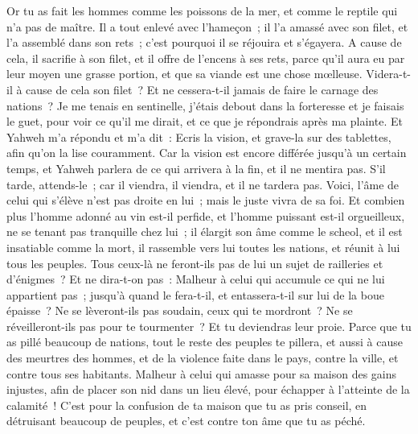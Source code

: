 \begin{multicols}{2}
Or tu as fait les hommes comme les poissons de la mer, et comme le reptile qui n'a pas de maître.
Il a tout enlevé avec l'hameçon~; il l'a amassé avec son filet, et l'a assemblé dans son rets~; c'est pourquoi il se réjouira et s'égayera.
A cause de cela, il sacrifie à son filet, et il offre de l'encens à ses rets, parce qu'il aura eu par leur moyen une grasse portion, et que sa viande est une chose mœlleuse.
Videra-t-il à cause de cela son filet~? Et ne cessera-t-il jamais de faire le carnage des nations~?
\VerseOne{}Je me tenais en sentinelle, j'étais debout dans la forteresse et je faisais le guet, pour voir ce qu'il me dirait, et ce que je répondrais après ma plainte.
Et Yahweh m'a répondu et m'a dit~: Ecris la vision, et grave-la sur des tablettes, afin qu'on la lise couramment.
Car la vision est encore différée jusqu'à un certain temps, et Yahweh parlera de ce qui arrivera à la fin, et il ne mentira pas. S'il tarde, attends-le~; car il viendra, il viendra, et il ne tardera pas.
Voici, l'âme de celui qui s'élève n'est pas droite en lui~; mais le juste vivra de sa foi.
Et combien plus l'homme adonné au vin est-il perfide, et l'homme puissant est-il orgueilleux, ne se tenant pas tranquille chez lui~; il élargit son âme comme le scheol, et il est insatiable comme la mort, il rassemble vers lui toutes les nations, et réunit à lui tous les peuples.
Tous ceux-là ne feront-ils pas de lui un sujet de railleries et d'énigmes~? Et ne dira-t-on pas~: Malheur à celui qui accumule ce qui ne lui appartient pas~; jusqu'à quand le fera-t-il, et entassera-t-il sur lui de la boue épaisse~?
Ne se lèveront-ils pas soudain, ceux qui te mordront~? Ne se réveilleront-ils pas pour te tourmenter~? Et tu deviendras leur proie.
Parce que tu as pillé beaucoup de nations, tout le reste des peuples te pillera, et aussi à cause des meurtres des hommes, et de la violence faite dans le pays, contre la ville, et contre tous ses habitants.
Malheur à celui qui amasse pour sa maison des gains injustes, afin de placer son nid dans un lieu élevé, pour échapper à l'atteinte de la calamité~!
C'est pour la confusion de ta maison que tu as pris conseil, en détruisant beaucoup de peuples, et c'est contre ton âme que tu as péché.

\end{multicols}
